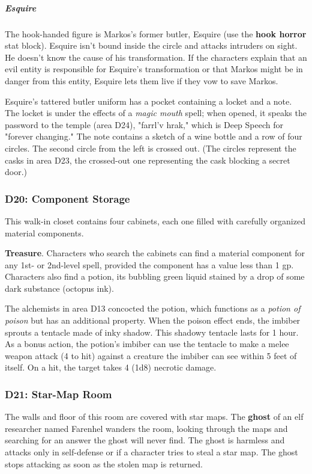 \documentclass[10pt,a4paper,twoside,bg=print,twocolumn,openany,nodeprecatedcode]{dndbook}
\begin{document}
\subparagraph{Esquire}
The hook-handed figure is Markos's former butler, Esquire (use the \textbf{hook horror} stat block). Esquire isn't bound inside the circle and attacks intruders on sight. He doesn't know the cause of his transformation. If the characters explain that an evil entity is responsible for Esquire's transformation or that Markos might be in danger from this entity, Esquire lets them live if they vow to save Markos.

Esquire's tattered butler uniform has a pocket containing a locket and a note. The locket is under the effects of a \textit{magic mouth} spell; when opened, it speaks the password to the temple (area D24), "farrl'v hrak," which is Deep Speech for "forever changing." The note contains a sketch of a wine bottle and a row of four circles. The second circle from the left is crossed out. (The circles represent the casks in area D23, the crossed-out one representing the cask blocking a secret door.)

\subsubsection{D20: Component Storage}
This walk-in closet contains four cabinets, each one filled with carefully organized material components.

\textbf{Treasure}. Characters who search the cabinets can find a material component for any 1st- or 2nd-level spell, provided the component has a value less than 1 gp. Characters also find a potion, its bubbling green liquid stained by a drop of some dark substance (octopus ink).

The alchemists in area D13 concocted the potion, which functions as a \textit{potion of poison} but has an additional property. When the poison effect ends, the imbiber sprouts a tentacle made of inky shadow. This shadowy tentacle lasts for 1 hour. As a bonus action, the potion's imbiber can use the tentacle to make a melee weapon attack (4 to hit) against a creature the imbiber can see within 5 feet of itself. On a hit, the target takes 4 (1d8) necrotic damage.

\subsubsection{D21: Star-Map Room}
The walls and floor of this room are covered with star maps. The \textbf{ghost} of an elf researcher named Farenhel wanders the room, looking through the maps and searching for an answer the ghost will never find. The ghost is harmless and attacks only in self-defense or if a character tries to steal a star map. The ghost stops attacking as soon as the stolen map is returned.
\end{document}
